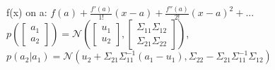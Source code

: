 f(x) on a: $f(a)+\tfrac{f'(a)}{1!}(x-a) + \tfrac{f''(a)} {2!}(x-a)^2 + ...$
$p(\begin{bmatrix}a_1\\a_2\end{bmatrix}) = \mathcal{N}(\begin{bmatrix}u_1\\u_2\end{bmatrix}, \begin{bmatrix}\Sigma_{11} \Sigma_{12}\\ \Sigma_{21} \Sigma_{22}\end{bmatrix})$,
$p(a_2 | a_1) = \mathcal{N}(u_2 + \Sigma_{21}\Sigma_{11}^{-1}(a_1-u_1), \Sigma_{22}-\Sigma_{21}\Sigma_{11}^{-1}\Sigma_{12})$
\\
